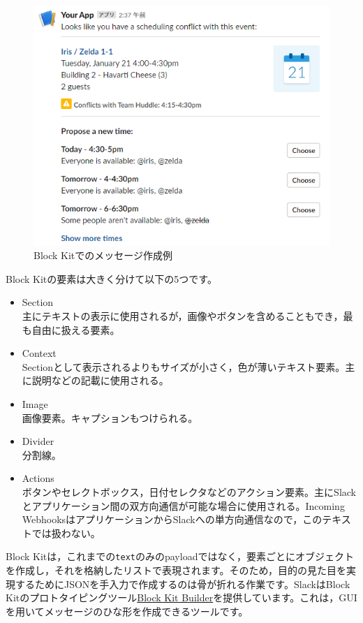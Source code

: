 \documentclass[uplatex,a4j]{jsarticle}
\begin{document}
\begin{figure}[H]
 \centering
 \includegraphics[keepaspectratio, scale=0.7]{images/block_kit_example.png}
 \caption{Block Kitでのメッセージ作成例}
 \label{fig:block_kit_example}
\end{figure}

Block Kitの要素は大きく分けて以下の5つです。

\begin{itemize}
\item Section \\
主にテキストの表示に使用されるが，画像やボタンを含めることもでき，最も自由に扱える要素。
\item Context\\
Sectionとして表示されるよりもサイズが小さく，色が薄いテキスト要素。主に説明などの記載に使用される。
\item Image\\
画像要素。キャプションもつけられる。
\item Divider\\
分割線。
\item Actions\\
ボタンやセレクトボックス，日付セレクタなどのアクション要素。主にSlackとアプリケーション間の双方向通信が可能な場合に使用される。Incoming WebhooksはアプリケーションからSlackへの単方向通信なので，このテキストでは扱わない。
\end{itemize}

Block Kitは，これまでの\verb|text|のみのpayloadではなく，要素ごとにオブジェクトを作成し，それを格納したリストで表現されます。そのため，目的の見た目を実現するためにJSONを手入力で作成するのは骨が折れる作業です。SlackはBlock Kitのプロトタイピングツール\href{https://api.slack.com/tools/block-kit-builder}{Block Kit Builder}を提供しています。これは，GUIを用いてメッセージのひな形を作成できるツールです。
\end{document}
